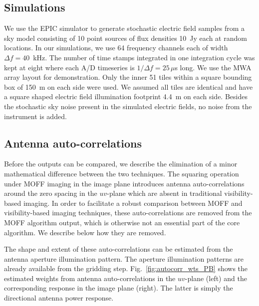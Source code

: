 \documentclass[a4paper,fleqn,usenatbib]{mnras}
\begin{document}
\subsection{Simulations}\label{sec:sim}

We use the EPIC simulator to generate stochastic electric field samples from a 
sky model consisting of 10 point sources of flux densities 10~Jy each at random 
locations. In our simulations, we use 64 frequency channels each of width 
$\Delta f = 40$~kHz. The number of time stamps integrated in one integration 
cycle was kept at eight where each A/D timeseries is $1/\Delta f=25\,\mu$s long. 
We use the MWA array layout \citep{bea12} for demonstration. Only the inner 51 
tiles within a square bounding box of 150~m on each side were used. We assumed 
all tiles are identical and have a square shaped electric field illumination 
footprint 4.4~m on each side. Besides the stochastic sky noise present in the 
simulated electric fields, no noise from the instrument is added.

\subsection{Antenna auto-correlations}\label{sec:rm-autocorr}

Before the outputs can be compared, we describe the elimination of a minor 
mathematical difference between the two techniques. The squaring operation under 
MOFF imaging in the image plane introduces antenna auto-correlations around the 
zero spacing in the $uv$-plane which are absent in traditional visibility-based 
imaging. In order to facilitate a robust comparison between MOFF and 
visibility-based imaging techniques, these auto-correlations are removed from 
the MOFF algorithm output, which is otherwise not an essential part of the core 
algorithm. We describe below how they are removed. 

The shape and extent of these auto-correlations can be estimated from the 
antenna aperture illumination pattern. The aperture illumination patterns
are already available from the gridding step. Fig.~\ref{fig:autocorr_wts_PB} 
shows the estimated weights from antenna auto-correlations in the $uv$-plane 
(left) and the corresponding response in the image plane (right). The latter 
is simply the directional antenna power response. 
\end{document}
